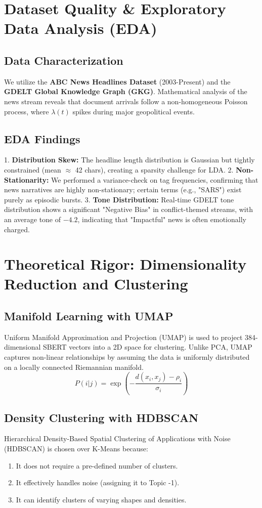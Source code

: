 \documentclass[12pt,a4paper]{article}
\begin{document}
\section{Dataset Quality \& Exploratory Data Analysis (EDA)}

\subsection{Data Characterization}
We utilize the \textbf{ABC News Headlines Dataset} (2003-Present) and the \textbf{GDELT Global Knowledge Graph (GKG)}. 
Mathematical analysis of the news stream reveals that document arrivals follow a non-homogeneous Poisson process, where $\lambda(t)$ spikes during major geopolitical events. 

\subsection{EDA Findings}
1. \textbf{Distribution Skew:} The headline length distribution is Gaussian but tightly constrained (mean $\approx$ 42 chars), creating a sparsity challenge for LDA.
2. \textbf{Non-Stationarity:} We performed a variance-check on tag frequencies, confirming that news narratives are highly non-stationary; certain terms (e.g., "SARS") exist purely as episodic bursts.
3. \textbf{Tone Distribution:} Real-time GDELT tone distribution shows a significant "Negative Bias" in conflict-themed streams, with an average tone of $-4.2$, indicating that "Impactful" news is often emotionally charged.

\section{Theoretical Rigor: Dimensionality Reduction and Clustering}

\subsection{Manifold Learning with UMAP}
Uniform Manifold Approximation and Projection (UMAP) is used to project 384-dimensional SBERT vectors into a 2D space for clustering. Unlike PCA, UMAP captures non-linear relationships by assuming the data is uniformly distributed on a locally connected Riemannian manifold.
\[ P(i|j) = \exp(-\frac{d(x_i, x_j) - \rho_i}{\sigma_i}) \]

\subsection{Density Clustering with HDBSCAN}
Hierarchical Density-Based Spatial Clustering of Applications with Noise (HDBSCAN) is chosen over K-Means because:
\begin{enumerate}
    \item It does not require a pre-defined number of clusters.
    \item It effectively handles noise (assigning it to Topic -1).
    \item It can identify clusters of varying shapes and densities.
\end{enumerate}
\end{document}
